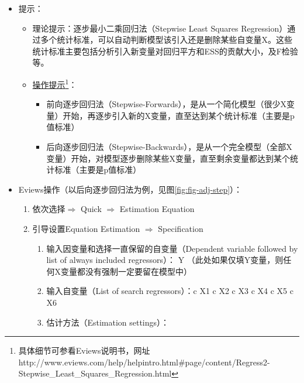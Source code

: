 \documentclass[12pt,(landscape,a4paper),(portrait,a4paper)]{article}
\providecommand{\tightlist}{%
  \setlength{\itemsep}{0pt}\setlength{\parskip}{0pt}}
\let\rmarkdownfootnote\footnote%
\def\footnote{\protect\rmarkdownfootnote}
\begin{document}
\begin{itemize}
\tightlist
\item
  提示：

  \begin{itemize}
  \tightlist
  \item
    理论提示：逐步最小二乘回归法（Stepwise Least Squares
    Regression）通过多个统计标准，可以自动判断模型该引入还是删除某些自变量X。这些统计标准主要包括分析引入新变量对回归平方和ESS的贡献大小，及F检验等。
  \item
    \href{http://www.eviews.com/help/helpintro.html\#page/content/Regress2-Stepwise_Least_Squares_Regression.html\%5D}{操作提示}\footnote{具体细节可参看Eviews说明书，网址http://www.eviews.com/help/helpintro.html\#page/content/Regress2-Stepwise\_Least\_Squares\_Regression.html}：

    \begin{itemize}
    \tightlist
    \item
      前向逐步回归法（Stepwise-Forwards），是从一个简化模型（很少X变量）开始，再逐步引入新的X变量，直至达到某个统计标准（主要是p值标准）
    \item
      后向逐步回归法（Stepwise-Backwards），是从一个完全模型（全部X变量）开始，对模型逐步删除某些X变量，直至剩余变量都达到某个统计标准（主要是p值标准）
    \end{itemize}
  \end{itemize}
\item
  Eviews操作（以后向逐步回归法为例，见图\ref{fig:fig-adj-step}）：

  \begin{enumerate}
  \def\labelenumi{\arabic{enumi})}
  \tightlist
  \item
    依次选择\(\Rightarrow\) Quick \(\Rightarrow\) Estimation Equation\\
  \item
    引导设置Equation Estimation \(\Rightarrow\) Specification

    \begin{enumerate}
    \def\labelenumii{\alph{enumii}.}
    \tightlist
    \item
      输入因变量和选择一直保留的自变量（Dependent variable followed by
      list of always included regressors）： Y
      （此处如果仅填Y变量，则任何X变量都没有强制一定要留在模型中）
    \item
      输入自变量（List of search regressors）：c X1 c X2 c X3 c X4 c X5
      c X6
    \item
      估计方法（Estimation settings）：


\end{enumerate}
\end{enumerate}
\end{itemize}
\end{document}
